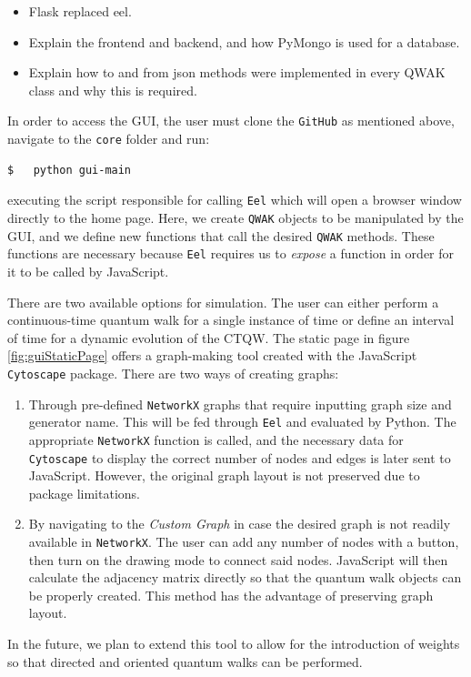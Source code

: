 \documentclass[../../dissertation.tex]{subfiles}
\begin{document}
\begin{itemize}
    \item Flask replaced eel.
    \item Explain the frontend and backend, and how PyMongo is used for a
        database.
    \item Explain how to and from json methods were implemented in every QWAK
        class and why this is required.

\end{itemize}

In order to access the GUI, the user must clone the \texttt{GitHub} as
mentioned above, navigate to the \texttt{core} folder and run:
\begin{lstlisting}[style=commands]
$   python gui-main 
\end{lstlisting}

executing the script responsible for calling \texttt{Eel} which will open a
browser window directly to the home page. Here, we create \texttt{QWAK} objects
to be manipulated by the GUI, and we define new functions that call the desired
\texttt{QWAK} methods. These functions are necessary because \texttt{Eel}
requires us to \textit{expose} a function in order for it to be called by
JavaScript.\par 

There are two available options for simulation. The user can either perform a
continuous-time quantum walk for a single instance of time or define an
interval of time for a dynamic evolution of the CTQW. The static page in figure
\ref{fig:guiStaticPage} offers a graph-making tool created with the JavaScript
\texttt{Cytoscape} package. There are two ways of creating graphs:
\begin{enumerate}
    \item Through pre-defined \texttt{NetworkX} graphs that require inputting
        graph size and generator name. This will be fed through \texttt{Eel}
        and evaluated by Python. The appropriate \texttt{NetworkX} function is
        called, and the necessary data for \texttt{Cytoscape} to display the
        correct number of nodes and edges is later sent to JavaScript. However,
        the original graph layout is not preserved due to package limitations. 

    \item By navigating to the \textit{Custom Graph} in case the desired graph
        is not readily available in \texttt{NetworkX}. The user can add any
        number of nodes with a button, then turn on the drawing mode to connect
        said nodes. JavaScript will then calculate the adjacency matrix
        directly so that the quantum walk objects can be properly created. This
        method has the advantage of preserving graph layout.
\end{enumerate}
In the future, we plan to extend this tool to allow for the introduction of
weights so that directed and oriented quantum walks can be performed.\par
\end{document}
